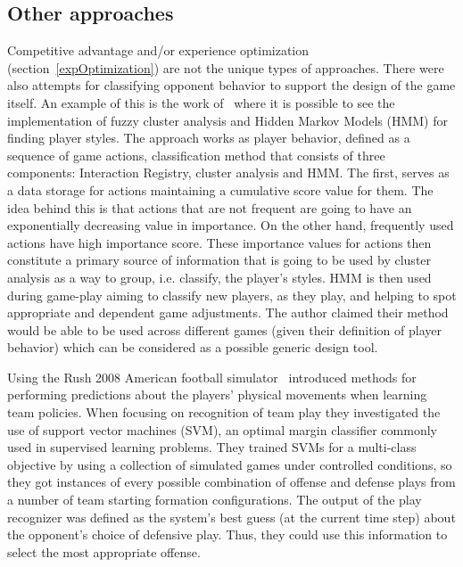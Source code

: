 \subsection{Other approaches}
Competitive advantage and/or experience optimization (section~\ref{expOptimization}) 
are not the unique types of approaches.%
There were also attempts for classifying opponent behavior to support the design of the game itself. An example of this is the work of~\cite{etheredge_generic_2013} where it is possible to see the implementation of fuzzy cluster analysis and Hidden Markov Models (HMM) for finding player styles. The approach works as  player behavior, defined as a sequence of game actions, classification method that consists of three components: Interaction Registry, cluster analysis and HMM. The first, serves as a data storage for actions maintaining a cumulative score value for them. The idea behind this is that actions that are not frequent are going to have an exponentially decreasing value in importance. On the other hand, frequently used actions have high importance score. These importance values for actions then constitute a primary source of information that is going to be used by cluster analysis as a way to group, i.e. classify, the player's styles. HMM is then used during game-play aiming to classify new players, as they play, and helping to spot appropriate and dependent game adjustments. The author claimed their method would be able to be used across different games (given their definition of player behavior) which can be considered as a possible generic design tool.

Using the Rush 2008 American football simulator~\cite{laviersa_using_2014} introduced methods for performing predictions about the players' physical movements when learning team policies. When focusing on recognition of team play they investigated the use of support vector machines (SVM), an optimal margin classifier commonly used in supervised learning problems. They trained SVMs for a multi-class objective by using a collection of simulated games under controlled conditions, so they got instances of every possible combination of offense and defense plays from a number of team starting formation configurations. The output of the play recognizer was defined as the system's best guess (at the current time step) about the opponent's choice of defensive play. Thus, they could use this information to select the most appropriate offense.

